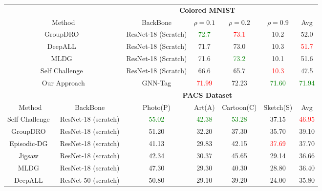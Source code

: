 \begin{table*}[ht]
\begin{center}
    \begin{tabular}{ccccccc}
  \toprule



         &          &   \multicolumn{4}{c}{\bf Colored MNIST~\cite{Arjovsky:etal:ARXIV20, Gulrajani:etal:ARXIV20}} & \\
  \multicolumn{2}{c}{Method} & BackBone &  $\rho=0.1$ & $\rho=0.2$ & $\rho=0.9$ & Avg\\
  \hline

   \multicolumn{2}{c}{GroupDRO~\cite{Sagawa:etal:ICLR20}} & ResNet-18 (Scratch)        &     \textcolor{green}{72.7}   &       \textcolor{red}{73.1} &          10.2 &          52.0 \\
   \multicolumn{2}{c}{DeepALL~\cite{Li:etal:ICCV17}}    & ResNet-18 (Scratch)       &     71.7   &       73.0 &          10.3 &           \textcolor{red}{51.7} \\

   \multicolumn{2}{c}{MLDG~\cite{Li:mini:etal:AAAI18}}    & ResNet-18 (Scratch)        &     71.6   &       \textcolor{green}{73.2} &          10.1 &          51.6 \\
   \multicolumn{2}{c}{Self Challenge~\cite{Huang:etal:ECCV20}}  & ResNet-18 (Scratch)        &     66.6   &       65.7 &          \textcolor{red}{10.3} &           47.5 \\


  \hline
  \multicolumn{2}{c}{Our Approach}   & GNN-Tag &  \textcolor{red}{71.99} & 72.23 & \textcolor{green}{71.60} & \textcolor{green}{71.94} \\ 
    
  \hline
     
         &          & \multicolumn{4}{c}{\bf PACS Dataset~\cite{Li:etal:ICCV17}} & \\
  Method & BackBone &  Photo(P) & Art(A) & Cartoon(C) & Sketch(S) & Avg\\
  \hline

  Self Challenge~\cite{Huang:etal:ECCV20}& ResNet-18 (scratch)  & \textcolor{green}{55.02} & \textcolor{green}{42.38} & \textcolor{green}{53.28} & 37.15 & \textcolor{red}{46.95} \\
  GroupDRO~\cite{Sagawa:etal:ICLR20}      & ResNet-18 (scratch)  & 51.20 & 32.20 & 37.30 & 35.70 & 39.10 \\
  Episodic-DG~\cite{Li:mini:etal:ICCV19} & ResNet-18 (scratch)  & 41.13 & 29.83 & 42.15 & \textcolor{red}{37.69} & 37.70\\
  Jigsaw~\cite{Carlucci:mini:etal:CVPR19} & ResNet-18 (scratch)  & 42.34 & 30.37 & 45.65 & 29.14 & 36.66 \\
  MLDG~\cite{Li:mini:etal:AAAI18}         & ResNet-18 (scratch)  & 47.30 & 29.30 & 40.30 & 28.80 & 36.40 \\
  DeepALL~\cite{Li:etal:ICCV17}      & ResNet-50 (scratch)  & 50.80 & 29.10 & 39.20 & 24.00 & 35.80 \\


\end{tabular}
\end{center}
\end{table*}
